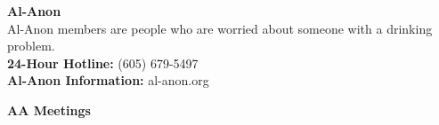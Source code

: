 \documentclass[11pt,twoside,letterpaper]{article}
\def\7pt{\fontsize{7}{8}\selectfont}
\def\8pt{\fontsize{8.5}{10}\selectfont}
\begin{document}
  \begin{minipage}[r][\dimexpr 0.485\textheight][t]{\dimexpr 0.485\textwidth}
    {\textbf{Al-Anon}}\hrulefill\\
{\7pt Al-Anon members are people who are worried about someone with a drinking problem.}\\
{\7pt\textbf{24-Hour Hotline:} (605) 679-5497}\\
{\7pt\textbf{Al-Anon Information:} al-anon.org}


  \end{minipage}

  \pagebreak


    {\textbf{AA Meetings}}\hrulefill
\end{document}
